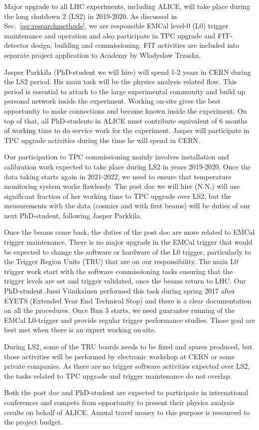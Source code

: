 Major upgrade to all LHC experiments, including ALICE, will take place during the long shutdown 2 (LS2) in 2019-2020. As discussed in Sec.~\ref{sec:researchmethods}, we are responsible EMCal level-0 (L0) trigger maintenance and operation and also participate in TPC upgrade and FIT-detector design, building and commissioning. FIT activities are included into separate project application to Academy by Wladyslaw Trzaska. 

Jasper Parkkila (PhD-student we will hire) will spend 1-2 years in CERN during the LS2 period. His main task will be the physics analysis related flow. This period is essential to attach to the large experimental community and build up personal network inside the experiment. Working on-site gives the best opportunity to make connections and become known inside the experiment. On top of that, all PhD-students in ALICE must contribute equivalent of 6 months of working time to do service work for the experiment. Jasper will participate in TPC upgrade activities during the time he will spend in CERN.

Our participation to TPC commissioning mainly involves installation and calibration work expected to take place during LS2 in years 2019-2020. Once the data taking starts again in 2021-2022, we need to ensure that temperature monitoring system works flawlessly. The post doc we will hire (N.N.) will use significant fraction of her working time to TPC upgrade over LS2, but the measurements with the data (cosmics and with first beams) will be duties of our next PhD-student, following Jasper Parkkila.

Once the beams come back, the duties of the post doc are more related to EMCal trigger maintenance. There is no major upgrade in the EMCal trigger that would be expected to change the software or hardware of the L0 trigger, particularly to the Trigger Region Units (TRU) that are on our responsibility. The main L0 trigger work start with the software commissioning tasks ensuring that the trigger levels are set and trigger validated, once the beams return to LHC. Our PhD-student Jussi Viinikainen performed this task during spring 2017 after EYETS (Extended Year End Technical Stop) and there is a clear documentation on all the procedures. Once Run 3 starts, we need guarantee running of the EMCal L0-trigger and provide regular trigger performance studies. Those goal are best met when there is an expert working on-site.

During LS2, some of the TRU boards needs to be fixed and spares produced, but those activities will be performed by electronic workshop at CERN or some private companies. As there are no trigger software activities expected over LS2, the tasks related to TPC upgrade and trigger maintenance do not overlap.

Both the post doc and PhD-student are expected to participate in international conferences and compete from opportunity to present their physics analysis results on behalf of ALICE. Annual travel money to this purpose is resourced to the project budget.

\nopagebreak
